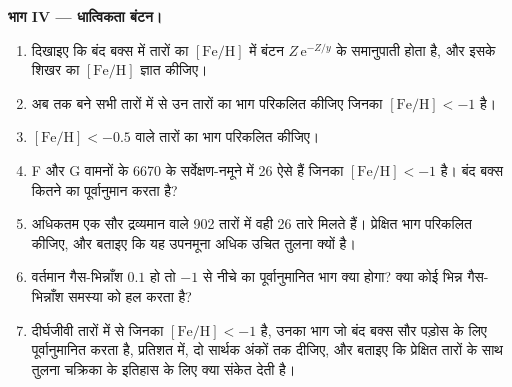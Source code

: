 \begin{problem}[{सप्ताहांत समस्या --- सौर मिश्रण से दीर्घजीवी तारों की
धात्विकताओं तक}]
\medskip\noindent\textbf{भाग IV --- धात्विकता बंटन।}
\begin{enumerate}[resume]
\item दिखाइए कि बंद बक्स में तारों का $[\mathrm{Fe/H}]$ में बंटन
  $Z\,\mathrm{e}^{-Z/y}$ के समानुपाती होता है, और
  इसके शिखर का $[\mathrm{Fe/H}]$ ज्ञात कीजिए।
\item अब तक बने सभी तारों में से उन तारों का भाग परिकलित कीजिए जिनका
  $[\mathrm{Fe/H}] < -1$ है।
\item $[\mathrm{Fe/H}] < -0.5$ वाले तारों का भाग परिकलित कीजिए।
\item F और G वामनों के 6670 के सर्वेक्षण-नमूने में 26 ऐसे हैं जिनका
  $[\mathrm{Fe/H}] < -1$ है। बंद बक्स कितने का पूर्वानुमान करता है?
\item अधिकतम एक सौर द्रव्यमान वाले 902 तारों में वही 26 तारे
  मिलते हैं। प्रेक्षित भाग परिकलित कीजिए, और बताइए कि यह उपनमूना
  अधिक उचित तुलना क्यों है।
\item वर्तमान गैस-भिन्नाँश $0.1$ हो तो $-1$ से नीचे का पूर्वानुमानित
  भाग क्या होगा? क्या कोई भिन्न गैस-भिन्नाँश समस्या को
  हल करता है?
\item दीर्घजीवी तारों में से जिनका $[\mathrm{Fe/H}] < -1$ है, उनका भाग
  जो बंद बक्स सौर पड़ोस के लिए पूर्वानुमानित करता है, प्रतिशत में,
  दो सार्थक अंकों तक दीजिए, और बताइए कि प्रेक्षित तारों के साथ तुलना
  चक्रिका के इतिहास के लिए क्या संकेत देती है।
\end{enumerate}
\end{problem}
